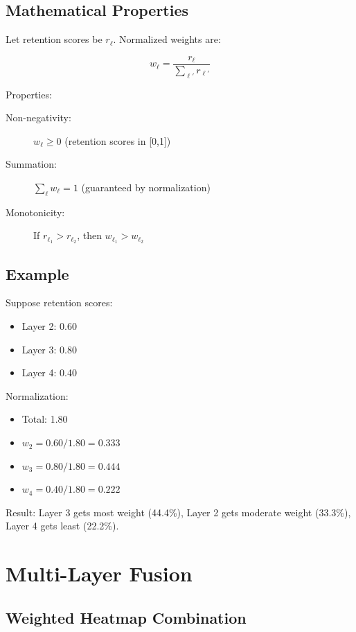 \documentclass[12pt,a4paper,oneside]{book}
\begin{document}
\subsection{Mathematical Properties}

Let retention scores be $r_\ell$. Normalized weights are:

\begin{equation}
w_\ell = \frac{r_\ell}{\sum_{\ell'} r_{\ell'}}
\label{eq:normalized_weights}
\end{equation}

Properties:
\begin{description}
  \item[Non-negativity:] $w_\ell \geq 0$ (retention scores in [0,1])
  \item[Summation:] $\sum_\ell w_\ell = 1$ (guaranteed by normalization)
  \item[Monotonicity:] If $r_{\ell_1} > r_{\ell_2}$, then $w_{\ell_1} > w_{\ell_2}$
\end{description}

\subsection{Example}

Suppose retention scores:
\begin{itemize}
  \item Layer 2: 0.60
  \item Layer 3: 0.80
  \item Layer 4: 0.40
\end{itemize}

Normalization:
\begin{itemize}
  \item Total: 1.80
  \item $w_2 = 0.60 / 1.80 = 0.333$
  \item $w_3 = 0.80 / 1.80 = 0.444$
  \item $w_4 = 0.40 / 1.80 = 0.222$
\end{itemize}

Result: Layer 3 gets most weight (44.4\%), Layer 2 gets moderate weight (33.3\%), Layer 4 gets least (22.2\%).

\section{Multi-Layer Fusion}

\subsection{Weighted Heatmap Combination}
\end{document}
